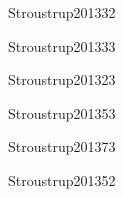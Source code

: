 \begin{syllabus}
\begin{unit}{\ALBasicAnalysisDef}{}{Stroustrup2013}{3}{2}
   \begin{topics}
      \item \ALBasicAnalysisTopicAsymptotic
      \item \ALBasicAnalysisTopicIdentifying
   \end{topics}
   \begin{learningoutcomes}
      \item \ALBasicAnalysisObjTHREE
   \end{learningoutcomes}
\end{unit}

\begin{unit}{\ALFundamentalAlgorithmsDef}{}{Stroustrup2013}{3}{3}
    \ALFundamentalAlgorithmsAllTopics
    \ALFundamentalAlgorithmsAllObjectives
\end{unit}

\begin{unit}{\PLDeclarationsAndTypesDef}{}{Stroustrup2013}{2}{3}
    \PLDeclarationsAndTypesAllTopics
    \PLDeclarationsAndTypesAllObjectives
\end{unit}

\begin{unit}{\PLAbstractionMechanismsDef}{}{Stroustrup2013}{5}{3}
    \PLAbstractionMechanismsAllTopics
    \PLAbstractionMechanismsAllTopics
\end{unit}

\begin{unit}{\PLObjectOrientedProgrammingDef}{}{Stroustrup2013}{7}{3}
    \PLObjectOrientedProgrammingAllTopics
    \PLObjectOrientedProgrammingAllObjectives
\end{unit}

\begin{unit}{\SESoftwareDesignDef}{}{Stroustrup2013}{5}{2}
   \begin{topics}
	\item \SESoftwareDesignTopicFundamental%
	\item \SESoftwareDesignTopicTherole%
	\item \SESoftwareDesignTopicDesignPatterns%
   \end{topics}
   \begin{learningoutcomes}
      \item \SESoftwareDesignObjONE
      \item \SESoftwareDesignObjFIVE
   \end{learningoutcomes}
\end{unit}


\end{syllabus}
